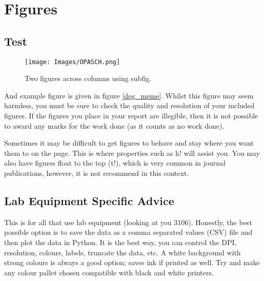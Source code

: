 \documentclass[conference,10pt]{IEEEtran}
\begin{document}
\section{Figures}
\label{sub:figsec}

\subsection{Test}
\label{sub:figsub}

\begin{figure*}[t!]
    \centering
    \texttt{[image: Images/OPASCH.png]}
    \caption{Two figures across columns using subfig.}
    \label{fig_sim}
\end{figure*}




    And example figure is given in figure \ref{dog_meme}. Whilst this figure may seem harmless, you must be sure to check the quality and resolution of your included figures. If the figures you place in your report are illegible, then it is not possible to award any marks for the work done (as it counts as no work done).

    Sometimes it may be difficult to get figures to behave and stay where you want them to on the page. This is where properties such as h! will assist you. You may also have figures float to the top (t!), which is very common in journal publications, however, it is not recommend in this context.

\subsection{Lab Equipment Specific Advice}
    This is for all that use lab equipment (looking at you 3106). Honestly, the best possible option is to save the data as a comma separated values (CSV) file and then plot the data in Python. It is the best way, you can control the DPI, resolution, colours, labels, truncate the data, etc. A white background with strong colours is always a good option; saves ink if printed as well. Try and make any colour pallet chosen compatible with black and white printers.
    
\end{document}
